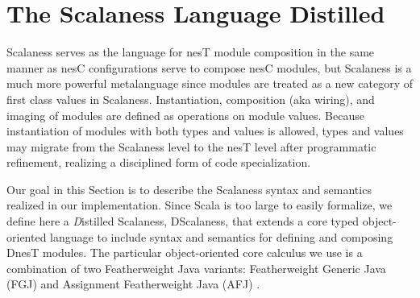 \section{The Scalaness Language Distilled}
\label{section-scalaness}

Scalaness serves as the language for nesT module composition in the same manner as nesC
configurations serve to compose nesC modules, but Scalaness is a much more powerful metalanguage
since modules are treated as a new category of first class values in Scalaness. Instantiation,
composition (aka wiring), and imaging of modules are defined as operations on module values.
Because instantiation of modules with both types and values is allowed, types and values may
migrate from the Scalaness level to the nesT level after programmatic refinement, realizing a
disciplined form of code specialization.

Our goal in this Section is to describe the Scalaness syntax and semantics realized in our
implementation. Since Scala is too large to easily formalize, we define here a \emph{D}istilled
Scalaness, DScalaness, that extends a core typed object-oriented language to include syntax and
semantics for defining and composing DnesT modules. The particular object-oriented core calculus
we use is a combination of two Featherweight Java variants: Featherweight Generic Java (FGJ)
\cite{FJ} and Assignment Featherweight Java (AFJ) \cite{AFJ}.
%


